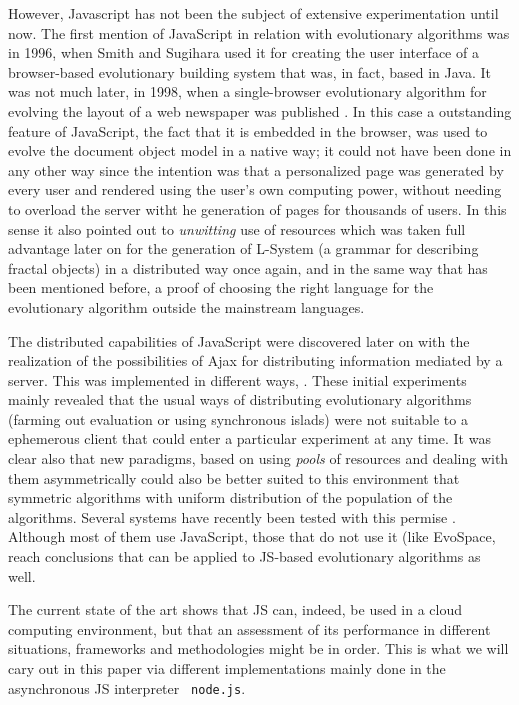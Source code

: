 \documentclass{sig-alternate}
\begin{document}
However, Javascript has not been the subject of extensive
experimentation until now. The first mention of JavaScript in relation
with evolutionary algorithms was in 1996, when Smith and Sugihara
\cite{smith1996ga} used it for creating the user interface of a
browser-based evolutionary building system that was, in fact, based in
Java. It was not much later, in 1998, when a single-browser
evolutionary algorithm for evolving the layout of a web newspaper was
published \cite{jj-ppsn98}. In this case a outstanding feature of
JavaScript, the fact that it is embedded in the browser, was used to
evolve the document object model in a native way; it could not have
been done in any other way since the intention was that a personalized
page was generated by every user and rendered using the user's own
computing power, without needing to overload the server witht he
generation of pages for thousands of users. In this sense it also
pointed out to {\em unwitting} \cite{klein2007unwitting} use of resources which was taken full
advantage later on for the generation of L-System (a grammar for
describing fractal objects) in a distributed way
\cite{langdon2004global} once again, and in the same way that has been
mentioned before, a proof of choosing the right language for the
evolutionary algorithm outside the mainstream languages.

The distributed capabilities of JavaScript were discovered later on
with the realization of the possibilities of Ajax for distributing
information mediated by a server. This was implemented in different
ways, \cite{gecco07:workshop:dcor,klein2007unwitting,agajaj}. These
initial experiments mainly revealed that the usual ways of
distributing evolutionary algorithms (farming out evaluation or using
synchronous islads) were not suitable to a ephemerous client that
could enter a particular experiment at any time. It was clear also
that new paradigms, based on using {\em pools} of resources and
dealing with them asymmetrically could also be better suited to this
environment that symmetric algorithms with uniform distribution of the
population of the algorithms. Several systems have recently been
tested with this permise
\cite{DBLP:conf/evoW/ValdezTVGO13,sofea:cec2012}. Although most of
them use JavaScript, those that do not use it (like EvoSpace,
\cite{DBLP:conf/evoW/ValdezTVGO13} reach conclusions that can be
applied to JS-based evolutionary algorithms as well.

The current state of the art shows that JS can, indeed, be used in a
cloud computing environment, but that an assessment of its performance
in different situations, frameworks and methodologies might be in
order. This is what we will cary out in this paper via different
implementations mainly done in the asynchronous JS interpreter {\tt
  node.js}.
\end{document}
